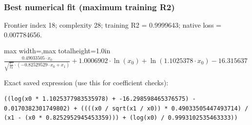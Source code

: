 \documentclass[10pt,letterpaper,landscape]{article}
\begin{document}
\begin{minipage}[t]{0.485\textwidth}
\subsubsection*{Best numerical fit (maximum training R2)}
Frontier index 18; complexity 28; training R2 = 0.9999643; native loss = 0.007784656.
\begin{center}\begin{adjustbox}{max width=\linewidth,max totalheight=1.0in}$\displaystyle \frac{0.49033505 \cdot x_{0}}{\sqrt{\frac{x_{1}}{x_{0}}} \cdot \left(- 0.82529529 \cdot x_{0} + x_{1}\right)} + 1.0006902 \cdot \ln{\left(x_{0} \right)} + \ln{\left(1.1025378 \cdot x_{0} \right)} - 16.315637$\end{adjustbox}\end{center}
{\scriptsize Exact saved expression (use this for coefficient checks):}
\begin{lstlisting}
((log(x0 * 1.1025377983535978) + -16.298598465376575) - 0.0170382301749802) + ((((x0 / sqrt(x1 / x0)) * 0.49033505447493714) / (x1 - (x0 * 0.8252952945453359))) + (log(x0) / 0.9993102535463333))
\end{lstlisting}
\end{minipage}\hfill
\end{document}
